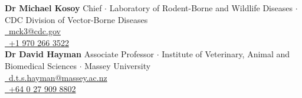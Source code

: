 \documentclass[letterpaper]{deedy-resume} %
\begin{document}
\sectionspace
\textbf{Dr Michael Kosoy} Chief $\cdot$ Laboratory of Rodent-Borne and Wildlife Diseases $\cdot$ CDC Division of Vector-Borne Diseases\\
\href{mailto:mck3@cdc.gov}{\Letter~mck3@cdc.gov}\\
\href{tel:+19702663522}{\Mobilefone~+1 970 266 3522}\\

\sectionspace
\textbf{Dr David Hayman} Associate Professor $\cdot$ Institute of Veterinary, Animal and Biomedical Sciences $\cdot$ Massey University\\
\href{mailto:d.t.s.hayman@massey.ac.nz}{\Letter~d.t.s.hayman@massey.ac.nz}\\
\href{tel:+640279098802}{\Mobilefone~+64 0 27 909 8802}\\
\end{document}
